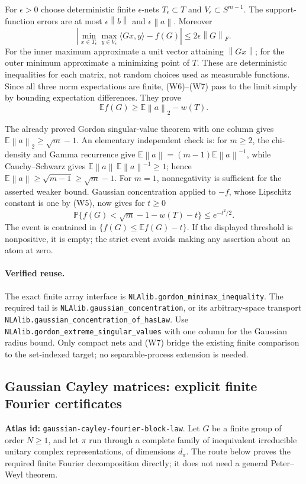 \documentclass[11pt,a4paper]{article}
\newcommand{\norm}[1]{\left\lVert#1\right\rVert}
\DeclareRobustCommand{\code}[1]{{\footnotesize\urlstyle{tt}\nolinkurl{#1}}}
\begin{document}
For $\epsilon>0$ choose deterministic finite $\epsilon$-nets
$T_\epsilon\subset T$ and $V_\epsilon\subset S^{m-1}$. The support-function
errors are at most $\epsilon\norm b$ and $\epsilon\norm a$. Moreover
\[
 \left|\min_{x\in T_\epsilon}\max_{y\in V_\epsilon}\langle Gx,y\rangle
                  -f(G)\right|\le2\epsilon\norm G_F.            \tag{W7}
\]
For the inner maximum approximate a unit vector attaining $\norm{Gx}$;
for the outer minimum approximate a minimizing point of $T$. These are
deterministic inequalities for each matrix, not random choices used as
measurable functions. Since all three norm expectations are finite,
(W6)--(W7) pass to the limit simply by bounding expectation differences.
They prove
\[
 \mathbb Ef(G)\ge\mathbb E\norm a_2-w(T).                       \tag{W8}
\]

The already proved Gordon singular-value theorem with one column gives
$\mathbb E\norm a_2\ge\sqrt m-1$. An elementary independent check is:
for $m\ge2$, the chi-density and Gamma recurrence give
$\mathbb E\norm a=(m-1)\mathbb E\norm a^{-1}$, while Cauchy--Schwarz
gives $\mathbb E\norm a\,\mathbb E\norm a^{-1}\ge1$; hence
$\mathbb E\norm a\ge\sqrt{m-1}\ge\sqrt m-1$. For $m=1$, nonnegativity
is sufficient for the asserted weaker bound.
Gaussian concentration applied to $-f$, whose Lipschitz constant is one
by (W5), now gives for $t\ge0$
\[
 \boxed{\mathbb P\{f(G)<\sqrt m-1-w(T)-t\}\le e^{-t^2/2}.}       \tag{W9}
\]
The event is contained in $\{f(G)\le\mathbb Ef(G)-t\}$.
If the displayed threshold is nonpositive, it is empty; the strict event
avoids making any assertion about an atom at zero.

\paragraph{Verified reuse.}
The exact finite array interface is \code{NLAlib.gordon_minimax_inequality}.
The required tail is \code{NLAlib.gaussian_concentration}, or its
arbitrary-space transport \code{NLAlib.gaussian_concentration_of_hasLaw}.
Use \code{NLAlib.gordon_extreme_singular_values} with one column for the
Gaussian radius bound. Only compact nets and (W7) bridge the existing finite
comparison to the set-indexed target; no separable-process extension is needed.

\subsection{Gaussian Cayley matrices: explicit finite Fourier certificates}
\label{route:gaussian-cayley-fourier-block-law}
\textbf{Atlas id:} \code{gaussian-cayley-fourier-block-law}.
Let $G$ be a finite group of order $N\ge1$, and let $\pi$ run through a
complete family of inequivalent irreducible unitary complex representations,
of dimensions $d_\pi$. The route below proves the required finite Fourier
decomposition directly; it does not need a general Peter--Weyl theorem.
\end{document}
